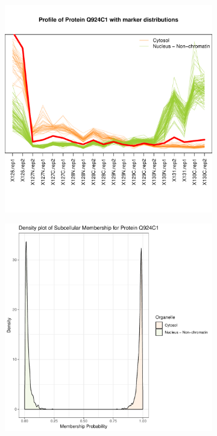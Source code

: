 \documentclass[12pt,english]{article}\usepackage[]{graphicx}\usepackage[]{color}
\makeatletter
\def\maxwidth{ %
  \ifdim\Gin@nat@width>\linewidth
    \linewidth
  \else
    \Gin@nat@width
  \fi
}
\newenvironment{knitrout}{}{} %
\makeatother
\begin{document}
\begin{figure}[p]
\begin{subfigure}[t]{0.5\textwidth}
\begin{knitrout}
{\centering \includegraphics[width=\maxwidth]{figure/Q924C1-prof-1} 

}



\end{knitrout}
    \caption{}
  \end{subfigure}
  \vspace{1cm}
  \begin{subfigure}[t]{0.5\textwidth}
    \centering
\begin{knitrout}
\color{fgcolor}

{\centering \includegraphics[width=\maxwidth]{figure/Q924C1-dens-1} 

}
\end{knitrout}
\end{subfigure}
\end{figure}
\end{document}
